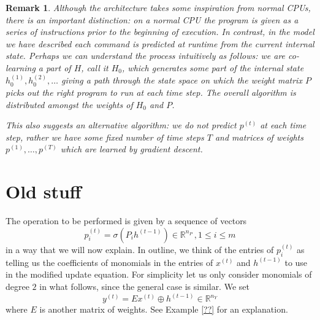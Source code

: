 \documentclass[english,letter paper,12pt,leqno]{article}
\theoremstyle{example}
\newtheorem{remark}[theorem]{Remark}
\numberwithin{equation}{section}
\def\be{\begin{equation}}
\def\ee{\end{equation}}
\begin{document}
\begin{remark} Although the architecture takes some inspiration from normal CPUs, there is an important distinction: on a normal CPU the program is given as a series of instructions prior to the beginning of execution. In contrast, in the model we have described each command is \emph{predicted} at runtime from the current internal state. Perhaps we can understand the process intuitively as follows: we are co-learning a part of $H$, call it $H_0$, which generates some part of the internal state $h^{(1)}_{0}, h^{(2)}_{0}, \ldots$ giving a path through the state space on which the weight matrix $P$ picks out the right program to run at each time step. The overall algorithm is distributed amongst the weights of $H_0$ and $P$.

This also suggests an alternative algorithm: we do not predict $p^{(t)}$ at each time step, rather we have some fixed number of time steps $T$ and matrices of weights $p^{(1)}, \ldots, p^{(T)}$ which are learned by gradient descent.
\end{remark}

\section{Old stuff}

The operation to be performed is given by a sequence of vectors
\be\label{eq:weight_P}
p^{(t)}_i = \sigma( P_i h^{(t-1)} ) \in \mathbb{R}^{n_P}\,, 1 \le i \le m
\ee
in a way that we will now explain. In outline, we think of the entries of $p^{(t)}_i$ as telling us the coefficients of monomials in the entries of $x^{(t)}$ and $h^{(t-1)}$ to use in the modified update equation. For simplicity let us only consider monomials of degree $2$ in what follows, since the general case is similar. We set
\be\label{eq:weight_E}
y^{(t)} = E x^{(t)} \oplus h^{(t-1)} \in \mathbb{R}^{n_Y}
\ee
where $E$ is another matrix of weights. See Example \ref{??} for an explanation.
\end{document}
